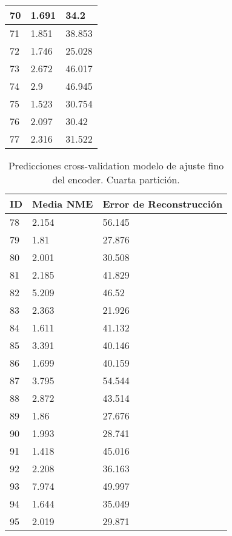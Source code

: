 \begin{table}[!ht]
\begin{tabular}{|l|l|l|}
        70 & 1.691 & 34.2 \\ \hline
        71 & 1.851 & 38.853 \\ \hline
        72 & 1.746 & 25.028 \\ \hline
        73 & 2.672 & 46.017 \\ \hline
        74 & 2.9 & 46.945 \\ \hline
        75 & 1.523 & 30.754 \\ \hline
        76 & 2.097 & 30.42 \\ \hline
        77 & 2.316 & 31.522 \\ \hline
    \end{tabular}
\end{table}

\begin{table}[!ht]
    \centering
    \caption{Predicciones cross-validation modelo de ajuste fino del encoder. Cuarta partición.}
    \begin{tabular}{|l|l|l|}
    \hline
    \cellcolor{gray!25}\textbf{ID} & \cellcolor{gray!25}\textbf{Media NME} & \cellcolor{gray!25}\textbf{Error de Reconstrucción} \\ \hline
        78 & 2.154 & 56.145 \\ \hline
        79 & 1.81 & 27.876 \\ \hline
        80 & 2.001 & 30.508 \\ \hline
        81 & 2.185 & 41.829 \\ \hline
        82 & 5.209 & 46.52 \\ \hline
        83 & 2.363 & 21.926 \\ \hline
        84 & 1.611 & 41.132 \\ \hline
        85 & 3.391 & 40.146 \\ \hline
        86 & 1.699 & 40.159 \\ \hline
        87 & 3.795 & 54.544 \\ \hline
        88 & 2.872 & 43.514 \\ \hline
        89 & 1.86 & 27.676 \\ \hline
        90 & 1.993 & 28.741 \\ \hline
        91 & 1.418 & 45.016 \\ \hline
        92 & 2.208 & 36.163 \\ \hline
        93 & 7.974 & 49.997 \\ \hline
        94 & 1.644 & 35.049 \\ \hline
        95 & 2.019 & 29.871 \\ \hline

\end{tabular}
\end{table}
